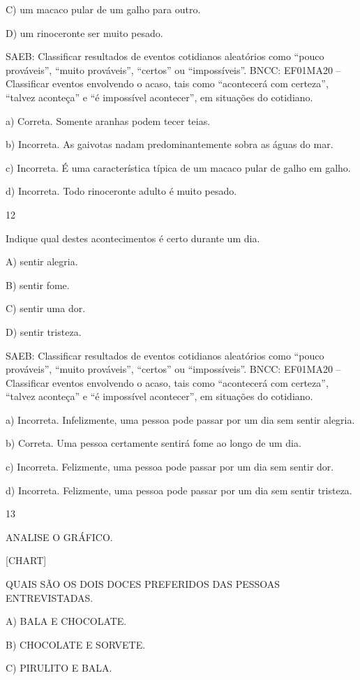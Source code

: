 C) um macaco pular de um galho para outro.

D) um rinoceronte ser muito pesado.

SAEB: Classificar resultados de eventos cotidianos aleatórios como
``pouco prováveis'', ``muito prováveis'', ``certos'' ou ``impossíveis''.
BNCC: EF01MA20 -- Classificar eventos envolvendo o acaso, tais como
``acontecerá com certeza'', ``talvez aconteça'' e ``é impossível
acontecer'', em situações do cotidiano.

a) Correta. Somente aranhas podem tecer teias.

b) Incorreta. As gaivotas nadam predominantemente sobra as águas do mar.

c) Incorreta. É uma característica típica de um macaco pular de galho em
galho.

d) Incorreta. Todo rinoceronte adulto é muito pesado.

\num{12}

Indique qual destes acontecimentos é certo durante um dia.

A) sentir alegria.

B) sentir fome.

C) sentir uma dor.

D) sentir tristeza.

SAEB: Classificar resultados de eventos cotidianos aleatórios como
``pouco prováveis'', ``muito prováveis'', ``certos'' ou ``impossíveis''.
BNCC: EF01MA20 -- Classificar eventos envolvendo o acaso, tais como
``acontecerá com certeza'', ``talvez aconteça'' e ``é impossível
acontecer'', em situações do cotidiano.

a) Incorreta. Infelizmente, uma pessoa pode passar por um dia sem sentir alegria.

b) Correta. Uma pessoa certamente sentirá fome ao longo de um dia.

c) Incorreta. Felizmente, uma pessoa pode passar por um dia sem sentir dor.

d) Incorreta. Felizmente, uma pessoa pode passar por um dia sem sentir tristeza.

\num{13}

ANALISE O GRÁFICO.

{{[}CHART{]}}

QUAIS SÃO OS DOIS DOCES PREFERIDOS DAS PESSOAS ENTREVISTADAS.

A) BALA E CHOCOLATE.

B) CHOCOLATE E SORVETE.

C) PIRULITO E BALA.

